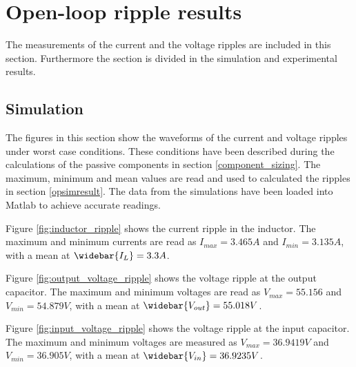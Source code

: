 
\chapter{Open-loop ripple results}
\vspace{-1cm}
The measurements of the current and the voltage ripples are included in this section. Furthermore the section is divided in the simulation and experimental results.
 \label{app:OL_ripple}
 
\section{Simulation}
The figures in this section show the waveforms of the current and voltage ripples under worst case conditions. These conditions have been described during the calculations of the passive components in section \ref{component_sizing}. The maximum, minimum and mean values are read and used to calculated the ripples in section \ref{opsimresult}. The data from the simulations have been loaded into Matlab to achieve accurate readings.

Figure \ref{fig:inductor_ripple} shows the current ripple in the inductor. The maximum and minimum currents are read as $I_{max} = 3.465A$ and $I_{min} = 3.135A$, with a mean at $\widebar{I_L} = 3.3A$.

Figure \ref{fig:output_voltage_ripple} shows the voltage ripple at the output capacitor. The maximum and minimum voltages are read as $V_{max} = 55.156$ and $V_{min} = 54.879V$, with a mean at $\widebar{V_{out}} = 55.018V$. 

Figure \ref{fig:input_voltage_ripple} shows the voltage ripple at the input capacitor. The maximum and minimum voltages are measured as $V_{max} = 36.9419V$ and $V_{min} = 36.905V$, with a mean at $\widebar{V_{in}} = 36.9235V$.


